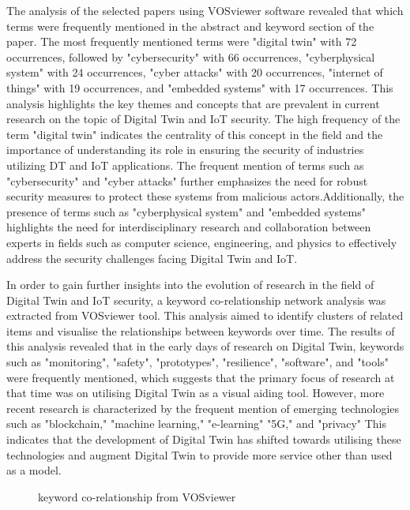 The analysis of the selected papers using VOSviewer software revealed that which terms were frequently mentioned in the abstract and keyword section of the paper. The most frequently mentioned terms were "digital twin" with 72 occurrences, followed by "cybersecurity" with 66 occurrences, "cyberphysical system" with 24 occurrences, "cyber attacks" with 20 occurrences, "internet of things" with 19 occurrences, and "embedded systems" with 17 occurrences. This analysis highlights the key themes and concepts that are prevalent in current research on the topic of Digital Twin and IoT security. The high frequency of the term "digital twin" indicates the centrality of this concept in the field and the importance of understanding its role in ensuring the security of industries utilizing DT and IoT applications. The frequent mention of terms such as "cybersecurity" and "cyber attacks" further emphasizes the need for robust security measures to protect these systems from malicious actors.Additionally, the presence of terms such as "cyberphysical system" and "embedded systems" highlights the need for interdisciplinary research and collaboration between experts in fields such as computer science, engineering, and physics to effectively address the security challenges facing Digital Twin and IoT.

In order to gain further insights into the evolution of research in the field of Digital Twin and IoT security, a keyword co-relationship network analysis was extracted from VOSviewer tool. This analysis aimed to identify clusters of related items and visualise the relationships between keywords over time. The results of this analysis revealed that in the early days of research on Digital Twin, keywords such as "monitoring", "safety", "prototypes", "resilience", "software", and "tools" were frequently mentioned, which suggests that the primary focus of research at that time was on utilising Digital Twin as a visual aiding tool. However, more recent research is characterized by the frequent mention of emerging technologies such as "blockchain," "machine learning," "e-learning" "5G," and "privacy" This indicates that the development of Digital Twin has shifted towards utilising these technologies and augment Digital Twin to provide more service other than used as a model.



\begin{figure}[H]
    \caption{keyword co-relationship from VOSviewer}
    
    \label{fig:co-occurrence-vosv}
\end{figure}

